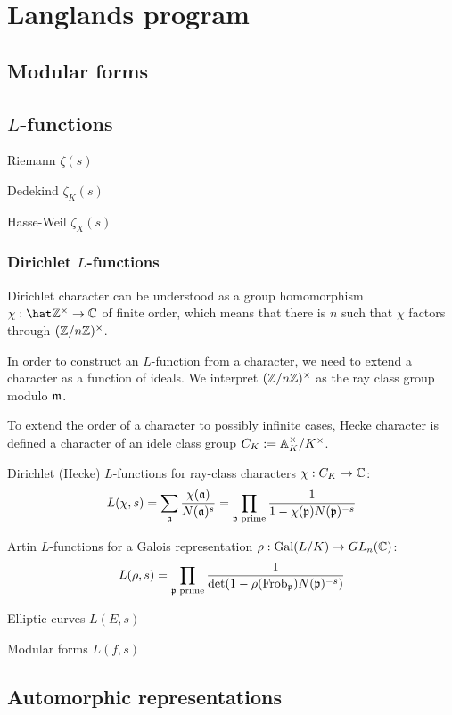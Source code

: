 \documentclass{../../large}
\newcommand{\Frob}{\mathrm{Frob}}
\begin{document}
\part{Langlands program}
\chapter{Modular forms}




\chapter{$L$-functions}
Riemann $\zeta(s)$

Dedekind $\zeta_K(s)$

Hasse-Weil $\zeta_X(s)$

\section{Dirichlet $L$-functions}

\begin{prb}
Dirichlet character can be understood as a group homomorphism $\chi:\hat\Z^\times\to\C$ of finite order, which means that there is $n$ such that $\chi$ factors through $(\mathbb{Z}/n\mathbb{Z})^\times$.

In order to construct an $L$-function from a character, we need to extend a character as a function of ideals.
We interpret $(\mathbb{Z}/n\mathbb{Z})^\times$ as the ray class group modulo $\mathfrak{m}$.

To extend the order of a character to possibly infinite cases, Hecke character is defined a character of an idele class group $C_K:=\mathbb{A}_K^\times/K^\times$.
\end{prb}


Dirichlet (Hecke) $L$-functions for ray-class characters $\chi:C_K\to\mathbb{C}$:
\[L(\chi,s)=\sum_{\mathfrak{a}}\frac{\chi(\mathfrak{a})}{N(\mathfrak{a})^s}=\prod_{\mathfrak{p}\text{ prime}}\frac1{1-\chi(\mathfrak{p})N(\mathfrak{p})^{-s}}\]

Artin $L$-functions for a Galois representation $\rho:\operatorname{Gal}(L/K)\to GL_n(\mathbb{C})$:
\[L(\rho,s)=\prod_{\fp\text{ prime}}\frac1{\det(1-\rho(\Frob_\fp)N(\fp)^{-s})}\]

Elliptic curves $L(E,s)$

Modular forms $L(f,s)$


\chapter{Automorphic representations}
\end{document}
